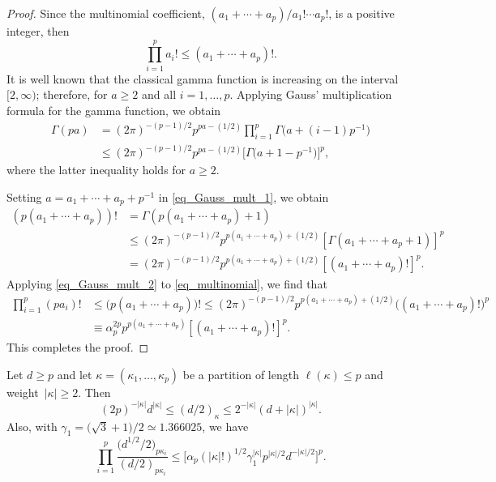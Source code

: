 \begin{proof}
Since the multinomial coefficient, $(a_1+\cdots+a_p)/a_1! \cdots a_p!$, is a positive integer, then
\begin{equation}
\label{eq_multinomial}
\prod_{i=1}^p a_i! \le (a_1 + \cdots + a_p)!.
\end{equation}
It is well known that the classical gamma function is increasing on the interval $[2,\infty)$; therefore,
for $a \ge 2$ and all $i=1,\ldots,p$. Applying Gauss' multiplication formula for the gamma function, we obtain
\begin{align}
\Gamma(pa) &= (2\pi)^{-(p-1)/2} p^{pa-(1/2)} \prod_{i=1}^p \Gamma\bigl(a + (i-1)p^{-1}\bigr) \nonumber \\
&\le (2\pi)^{-(p-1)/2} p^{pa-(1/2)} \bigl[\Gamma\bigl(a + 1 - p^{-1}\bigr)\bigr]^p,\label{eq_Gauss_mult_1}
\end{align}
where the latter inequality holds for $a \ge 2$.

Setting $a = a_1+\cdots+a_p + p^{-1}$ in \eqref{eq_Gauss_mult_1}, we obtain
\begin{align}
\label{eq_Gauss_mult_2}
(p (a_1+\cdots+a_p))! &= \Gamma(p (a_1+\cdots+a_p) + 1) \nonumber \\
&\le (2\pi)^{-(p-1)/2} p^{p (a_1+\cdots+a_p) + (1/2)} [\Gamma(a_1+\cdots+a_p+1)]^p \nonumber \\
&= (2\pi)^{-(p-1)/2} p^{p (a_1+\cdots+a_p) + (1/2)} [(a_1+\cdots+a_p)!]^p.
\end{align}
Applying \eqref{eq_Gauss_mult_2} to \eqref{eq_multinomial}, we find that
\begin{align*}
\prod_{i=1}^p (p a_i)! &\le \bigl(p (a_1+\cdots+a_p)\bigr)! \le (2\pi)^{-(p-1)/2} p^{p (a_1+\cdots+a_p) + (1/2)} \bigl((a_1+\cdots+a_p)!\bigr)^p \\
&\equiv \alpha_p^{2p} p^{p(a_1+\cdots+a_p)} [(a_1+\cdots+a_p)!]^p.
\end{align*}
This completes the proof.
\end{proof}



\begin{Lemma}
\label{lemma_ineqs}
Let $d \ge p$ and let $\kappa = (\kappa_1,\ldots,\kappa_p)$ be a partition of length $\ell(\kappa) \le p$ and weight~${|\kappa| \ge 2}$. Then
\begin{equation}
\label{eq_d_kappa_ineq}
(2p)^{-|\kappa|} d^{|\kappa|} \le (d/2)_\kappa \le 2^{-|\kappa|} (d + |\kappa|)^{|\kappa|}.
\end{equation}
Also, with $\gamma_1 = \bigl(\sqrt{3}+1\bigr)/2 \simeq 1.366025$, we have
\begin{equation}
\label{eq_d_kappa_ratio_ineq3}
\prod_{i=1}^p \frac{\bigl(d^{1/2}/2\bigr)_{p \kappa_i}}{(d/2)_{p \kappa_i}} \le \bigl[\alpha_p (|\kappa|!)^{1/2} \gamma_1^{|\kappa|} p^{|\kappa|/2} d^{-|\kappa|/2}\bigr]^p.
\end{equation}
\end{Lemma}

